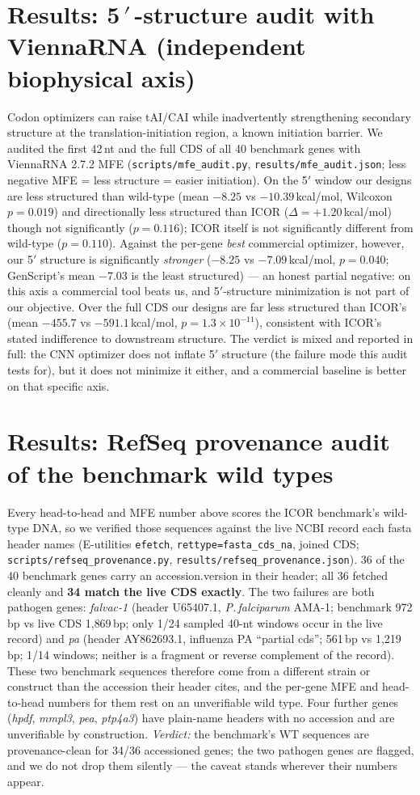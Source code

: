 \documentclass[11pt]{article}
\begin{document}
\section{Results: 5\,$'$\,-structure audit with ViennaRNA (independent biophysical axis)}
Codon optimizers can raise tAI/CAI while inadvertently strengthening secondary structure at the translation-initiation region, a known initiation barrier. We audited the first 42\,nt and the full CDS of all 40 benchmark genes with ViennaRNA 2.7.2 MFE (\texttt{scripts/mfe\_audit.py}, \texttt{results/mfe\_audit.json}; less negative MFE = less structure = easier initiation). On the 5$'$ window our designs are less structured than wild-type (mean $-8.25$ vs $-10.39$\,kcal/mol, Wilcoxon $p=0.019$) and directionally less structured than ICOR ($\Delta=+1.20$\,kcal/mol) though not significantly ($p=0.116$); ICOR itself is not significantly different from wild-type ($p=0.110$). Against the per-gene \emph{best} commercial optimizer, however, our 5$'$ structure is significantly \emph{stronger} ($-8.25$ vs $-7.09$\,kcal/mol, $p=0.040$; GenScript's mean $-7.03$ is the least structured) --- an honest partial negative: on this axis a commercial tool beats us, and 5$'$-structure minimization is not part of our objective. Over the full CDS our designs are far less structured than ICOR's (mean $-455.7$ vs $-591.1$\,kcal/mol, $p=1.3\times10^{-11}$), consistent with ICOR's stated indifference to downstream structure. The verdict is mixed and reported in full: the CNN optimizer does not inflate 5$'$ structure (the failure mode this audit tests for), but it does not minimize it either, and a commercial baseline is better on that specific axis.
\section{Results: RefSeq provenance audit of the benchmark wild types}
Every head-to-head and MFE number above scores the ICOR benchmark's wild-type DNA, so we verified those sequences against the live NCBI record each fasta header names (E-utilities \texttt{efetch}, \texttt{rettype=fasta\_cds\_na}, joined CDS; \texttt{scripts/refseq\_provenance.py}, \texttt{results/refseq\_provenance.json}). 36 of the 40 benchmark genes carry an accession.version in their header; all 36 fetched cleanly and \textbf{34 match the live CDS exactly}. The two failures are both pathogen genes: \emph{falvac-1} (header U65407.1, \emph{P.\,falciparum} AMA-1; benchmark 972\,bp vs live CDS 1{,}869\,bp; only 1/24 sampled 40-nt windows occur in the live record) and \emph{pa} (header AY862693.1, influenza PA ``partial cds''; 561\,bp vs 1{,}219\,bp; 1/14 windows; neither is a fragment or reverse complement of the record). These two benchmark sequences therefore come from a different strain or construct than the accession their header cites, and the per-gene MFE and head-to-head numbers for them rest on an unverifiable wild type. Four further genes (\emph{hpdf}, \emph{mmpl3}, \emph{pea}, \emph{ptp4a3}) have plain-name headers with no accession and are unverifiable by construction. \emph{Verdict:} the benchmark's WT sequences are provenance-clean for 34/36 accessioned genes; the two pathogen genes are flagged, and we do not drop them silently --- the caveat stands wherever their numbers appear.
\end{document}
